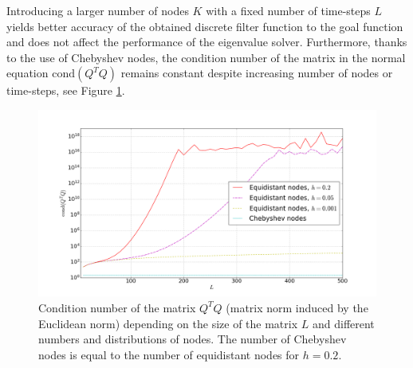 \documentclass[a4paper,11pt,bibliography=totoc,listof=totoc,headinclude=true,cleardoublepage=empty,oneside]{scrbook}
\begin{document}
Introducing a larger number of nodes $K$ with a fixed number of time-steps $L$ yields better accuracy of the obtained discrete filter function to the goal function and does not affect the performance of the eigenvalue solver. Furthermore, thanks to the use of Chebyshev nodes, the condition number of the matrix in the normal equation $\mathrm{cond}(Q^TQ)$ remains constant despite increasing number of nodes or time-steps, see Figure \ref{fig:least sq cond}.

\begin{figure}[h]
    \centering
    \includegraphics[width=1\linewidth]{latex//images//cheb_least_sq/Figure_3.png}
    \caption{Condition number of the matrix $Q^TQ$ (matrix norm induced by the Euclidean norm) depending on the size of the matrix $L$ and different numbers and distributions of nodes. The number of Chebyshev nodes is equal to the number of equidistant nodes for $h=0.2$. }
    \label{fig:least sq cond}
\end{figure}
\end{document}
